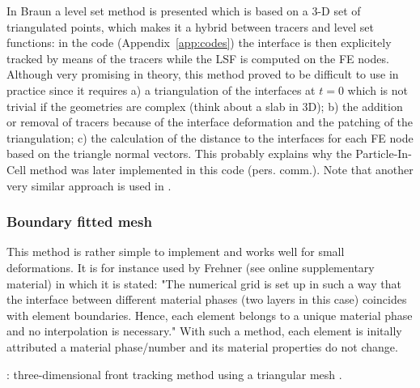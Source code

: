 In Braun \etal \cite{brtf08} a level set method is presented which is based on a 3-D set
of triangulated points, which makes it a hybrid between tracers and level set functions:
in the \douar code (Appendix~\ref{app:codes}) the interface is then explicitely tracked by means of the tracers while the LSF is computed 
on the FE nodes. Although very promising in theory, this method proved to be difficult to use in practice
since it requires a) a triangulation of the interfaces at $t=0$ which is not trivial if the geometries
are complex (think about a slab in 3D); b) the addition or removal of tracers because of the interface deformation
and the patching of the triangulation; c) the calculation of the distance to the interfaces for each 
FE node based on the triangle normal vectors. 
This probably explains why the Particle-In-Cell method was later implemented in this code (pers. comm.).
Note that another very similar approach is used in \cite{saev10}.



\subsubsection{Boundary fitted mesh}

This method is rather simple to implement and works well for small deformations. It is 
for instance used by Frehner \cite{freh14} (see online supplementary material) in which it is 
stated: "The numerical grid is set up in such a way that the interface
between different material phases (two layers in this case) coincides with element boundaries. Hence, each
element belongs to a unique material phase and no interpolation is necessary."
With such a method, each element is initally attributed a material phase/number and its material
properties do not change. 


\vspace{2cm} 

\Literature: three-dimensional front tracking method using a triangular mesh \cite{sclo03}.








